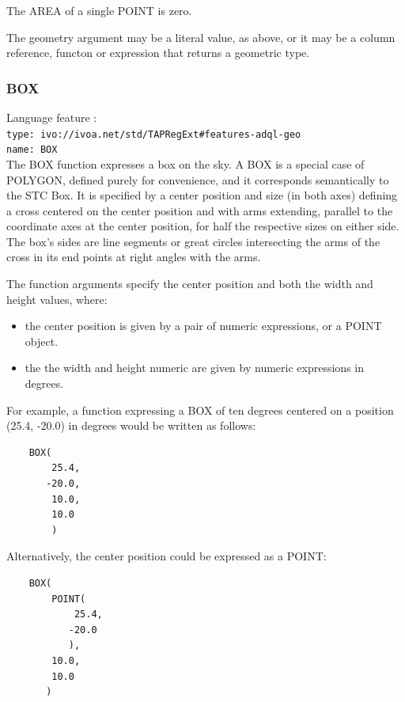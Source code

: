 \documentclass[11pt,a4paper]{ivoa}
\begin{document}
The AREA of a single POINT is zero.

The geometry argument may be a literal value, as above, or it may be a
column reference, functon or expression that returns a geometric type.

\subsubsection{BOX}
\label{sec:functions.geom.box}
{\footnotesize Language feature :}\\
{\footnotesize \verb|type: ivo://ivoa.net/std/TAPRegExt#features-adql-geo|}\\
{\footnotesize \verb|name: BOX|}\\

The BOX function expresses a box on the sky. A BOX is a special case of POLYGON,
defined purely for convenience, and it corresponds semantically to the STC Box.
It is specified by a center position and size
(in both axes) defining a cross centered on the center position and
with arms extending, parallel to the coordinate axes at the center position,
for half the respective sizes on either side. The box’s sides are line
segments or great circles intersecting the arms of the cross in its end
points at right angles with the arms.

The function arguments specify the center position
and both the width and height values, where:

\begin{itemize}
    \item the center position is given by a pair of numeric expressions, or a POINT object.
    \item the the width and height numeric are given by numeric expressions in degrees.
\end{itemize}

For example, a function expressing a BOX of ten degrees centered on a position
(25.4, -20.0) in degrees would be written as follows:

\begin{verbatim}
    BOX(
        25.4,
       -20.0,
        10.0,
        10.0
        )
\end{verbatim}

Alternatively, the center position could be expressed as a POINT:

\begin{verbatim}
    BOX(
        POINT(
            25.4,
           -20.0
           ),
        10.0,
        10.0
       )
\end{verbatim}
\end{document}
